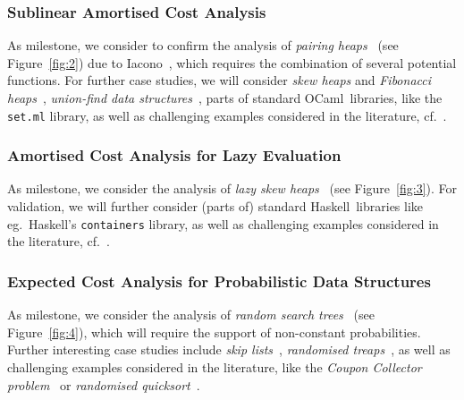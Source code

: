 \documentclass[
11pt,
usepdftitle=false,
aspectratio=169,
xcolor={table,usenames,dvipsnames},
handout,
]{beamer}
\begin{document}
\begin{frame}
  \frametitle{Sublinear Amortised Cost Analysis}


  As milestone, we consider to confirm the analysis of
\emph{pairing heaps}~\cite{Okasaki:1999} (see Figure~\ref{fig:2}) due to Iacono~\cite{conf/swat/Iacono00,conf/cocoa/IaconoY16}, which requires the combination of several potential functions.
%
For further case studies, we will consider \emph{skew heaps} and \emph{Fibonacci heaps}~\cite{Okasaki:1999}, \emph{union-find data structures}~\cite{journals/jar/ChargueraudP19},
parts of standard OCaml\ libraries,
like the \texttt{set.ml} library, as well as challenging examples considered in the literature, cf.~\cite{Okasaki:1999,ADM:2015,HDW:2017}.

\end{frame}

\begin{frame}
  \frametitle{Amortised Cost Analysis for Lazy Evaluation}


  As milestone, we consider the analysis of \emph{lazy skew heaps}~\cite{Okasaki04} (see Figure~\ref{fig:3}).
For validation, we will further consider (parts of) standard Haskell\ libraries like eg.\ Haskell's \texttt{containers} library, as well as challenging examples considered in the literature, cf.~\cite{Okasaki:1999,Okasaki04,JVFH:2017,MadhavanKK17,HVH:2020}.
\end{frame}

\begin{frame}
  \frametitle{Expected Cost Analysis for Probabilistic Data Structures}

  As milestone, we consider the analysis of \emph{random search trees}~\cite{MartinezR98} (see Figure~\ref{fig:4}), which will require the support of non-constant probabilities.
%
Further interesting case studies include \emph{skip lists}~\cite{Pugh90}, \emph{randomised treaps}~\cite{EberlHN20}, as well as challenging examples considered in the literature,
like the \emph{Coupon Collector problem}~\cite{MitzenMacherU05,KKMO:ACM:18,AMS:2020,ABD:2021} or \emph{randomised quicksort}~\cite{MR:1999,AvanziniLG19}.
\end{frame}
\end{document}
